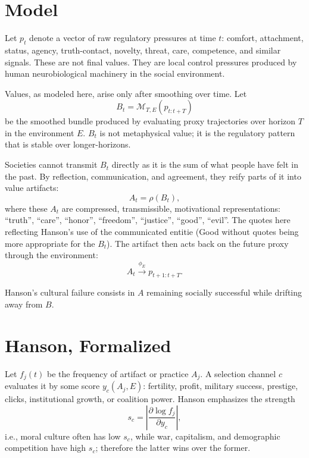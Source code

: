 \documentclass[10pt,twocolumn]{article}
\begin{document}
\section{Model}
Let $p_t$ denote a vector of raw regulatory pressures at time $t$: 
comfort, attachment, status, agency, truth-contact, novelty, threat, care, competence, and similar signals. 
These are not final values. They are local control pressures produced by human neurobiological machinery in the social environment.

Values, as modeled here, arise only after smoothing over time. Let
\begin{equation}
B_t = \mathcal M_{T,E}(p_{t:t+T})
\end{equation}
be the smoothed bundle produced by evaluating proxy trajectories over horizon $T$ in the environment $E$. 
$B_t$ is not metaphysical value; it is the regulatory pattern that is stable over longer-horizons.

Societies cannot transmit $B_t$ directly as it is the sum of what people have felt in the past. 
By reflection, communication, and agreement, they reify parts of it into value artifacts:
\begin{equation}
A_t = \rho(B_t),
\end{equation}
where these $A_t$ are compressed, transmissible, motivational representations: 
``truth'', ``care'', ``honor'', ``freedom'', ``justice'', ``good'', ``evil''. 
The quotes here reflecting Hanson's use of the communicated entitie (Good without quotes being more appropriate for the $B_t$).
The artifact then acts back on the future proxy through the environment:
\begin{equation}
A_t \xrightarrow{\phi_E} p_{t+1:t+T}.
\end{equation}

Hanson's cultural failure consists in $A$ remaining socially successful while drifting away from $B$.

\section{Hanson, Formalized}
Let $f_j(t)$ be the frequency of artifact or practice $A_j$. 
A selection channel $c$ evaluates it by some score $y_c(A_j,E)$: 
fertility, profit, military success, prestige, clicks, institutional growth, or coalition power. 
Hanson emphasizes the strength
\begin{equation}
s_c = \left|\frac{\partial \log f_j}{\partial y_c}\right|,
\end{equation}
i.e., moral culture often has low $s_c$, while war, capitalism, and demographic competition have high $s_c$; 
therefore the latter wins over the former.
\end{document}
